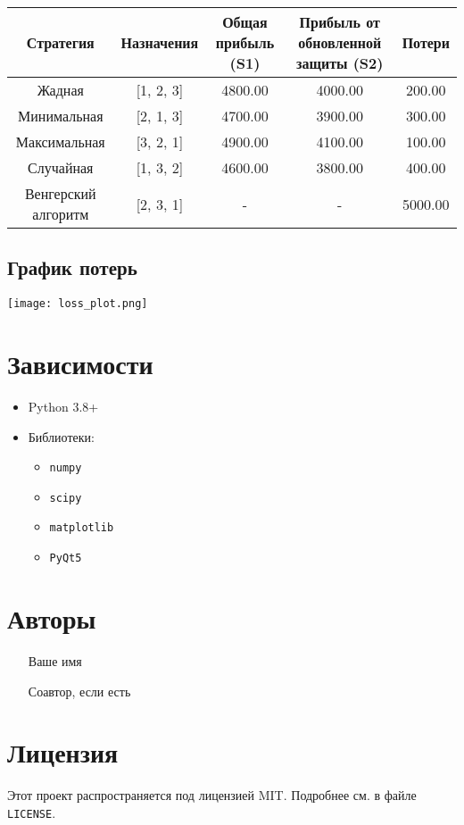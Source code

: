 \documentclass{article}
\begin{document}
\begin{center}
\begin{tabular}{|c|c|c|c|c|}
\hline
\textbf{Стратегия} & \textbf{Назначения} & \textbf{Общая прибыль (S1)} & \textbf{Прибыль от обновленной защиты (S2)} & \textbf{Потери} \\
\hline
Жадная & [1, 2, 3] & 4800.00 & 4000.00 & 200.00 \\
Минимальная & [2, 1, 3] & 4700.00 & 3900.00 & 300.00 \\
Максимальная & [3, 2, 1] & 4900.00 & 4100.00 & 100.00 \\
Случайная & [1, 3, 2] & 4600.00 & 3800.00 & 400.00 \\
Венгерский алгоритм & [2, 3, 1] & - & - & 5000.00 \\
\hline
\end{tabular}
\end{center}

\subsection*{График потерь}

\begin{center}
\texttt{[image: loss\_plot.png]}
\end{center}

\section*{Зависимости}

\begin{itemize}
    \item Python 3.8+
    \item Библиотеки:
    \begin{itemize}
        \item \texttt{numpy}
        \item \texttt{scipy}
        \item \texttt{matplotlib}
        \item \texttt{PyQt5}
    \end{itemize}
\end{itemize}

\section*{Авторы}

\begin{itemize}
    \item [Ваше имя]
    \item [Соавтор, если есть]
\end{itemize}

\section*{Лицензия}

Этот проект распространяется под лицензией MIT. Подробнее см. в файле \texttt{LICENSE}.
\end{document}
